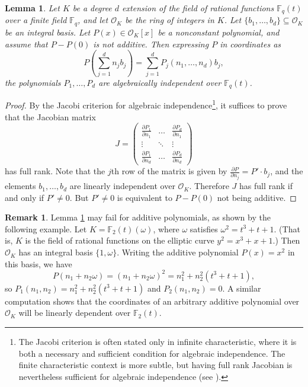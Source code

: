 \documentclass{amsart}
\newtheorem{lemma}[theorem]{Lemma}
\theoremstyle{definition}
\newtheorem{remark}[theorem]{Remark}
\numberwithin{equation}{section}
\newcommand{\F}{\mathbb{F}}
\newcommand{\mO}{\mathcal{O}}
\begin{document}
\begin{lemma} \label{lem: algebraically independent}
    Let $K$ be a degree $d$ extension of the field of rational functions $\F_q(t)$ over a finite field $\F_q$, and let $\mO_K$ be the ring of integers in $K$.
    Let $\{b_1, \dots, b_d\} \subseteq \mO_K$ be an integral basis.
    Let $P(x) \in \mO_K[x]$ be a nonconstant polynomial, and assume that $P - P(0)$ is not additive.
    Then expressing $P$ in coordinates as
    \begin{equation}
         P \left( \sum_{j=1}^d n_j b_j \right) = \sum_{j=1}^d P_j(n_1, \dots, n_d) b_j,
    \end{equation}
    the polynomials $P_1, \dots, P_d$ are algebraically independent over $\F_q(t)$.
\end{lemma}

\begin{proof}
    By the Jacobi criterion for algebraic independence\footnote{The Jacobi criterion is often stated only in infinite characteristic, where it is both a necessary and sufficient condition for algebraic independence. The finite characteristic context is more subtle, but having full rank Jacobian is nevertheless sufficient for algebraic independence (see \cite{speyer}).}, it suffices to prove that the Jacobian matrix
    \begin{equation*}
        J = \left( \begin{array}{ccc}
            \frac{\partial P_1}{\partial n_1} & \ldots & \frac{\partial P_d}{\partial n_1} \\
            \vdots & \ddots & \vdots \\
             \frac{\partial P_1}{\partial n_d} & \ldots & \frac{\partial P_d}{\partial n_d}
        \end{array} \right)
    \end{equation*}
    has full rank.
    Note that the $j$th row of the matrix is given by $\frac{\partial P}{\partial n_j} = P' \cdot b_j$, and the elements $b_1, \ldots, b_d$ are linearly independent over $\mO_K$.
    Therefore $J$ has full rank if and only if $P' \ne 0$.
    But $P' \ne 0$ is equivalent to $P - P(0)$ not being additive.
\end{proof}

\begin{remark}
    Lemma \ref{lem: algebraically independent} may fail for additive polynomials, as shown by the following example.
    Let $K = \F_2(t)(\omega)$, where $\omega$ satisfies $\omega^2 = t^3 + t + 1$.
    (That is, $K$ is the field of rational functions on the elliptic curve $y^2 = x^3+x+1$.)
    Then $\mO_K$ has an integral basis $\{1, \omega\}$.
    Writing the additive polynomial $P(x) = x^2$ in this basis, we have
    \begin{equation*}
        P(n_1 + n_2\omega) = (n_1+n_2\omega)^2 = n_1^2 + n_2^2(t^3+t+1),
    \end{equation*}
    so $P_1(n_1,n_2) = n_1^2 + n_2^2(t^3+t+1)$ and $P_2(n_1,n_2) = 0$.
    A similar computation shows that the coordinates of an arbitrary additive polynomial over $\mO_K$ will be linearly dependent over $\F_2(t)$.
\end{remark}
\end{document}
